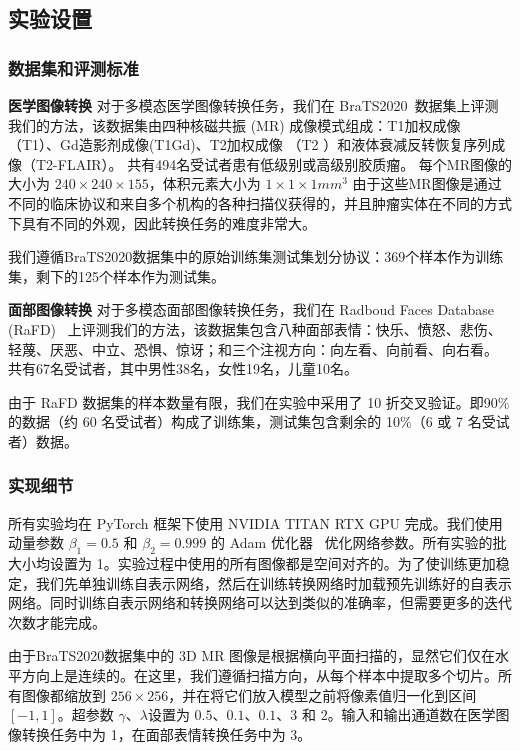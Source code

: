 \subsection{实验设置}

\subsubsection{数据集和评测标准}

\textbf{医学图像转换}
对于多模态医学图像转换任务，我们在 BraTS2020~\cite{bakas2018identifying}数据集上评测我们的方法，该数据集由四种核磁共振 (MR) 成像模式组成：T1加权成像（T1）、Gd造影剂成像(T1Gd)、T2加权成像 （T2 ）和液体衰减反转恢复序列成像（T2-FLAIR）。 共有494名受试者患有低级别或高级别胶质瘤。 每个MR图像的大小为 $240\times240\times155$，体积元素大小为 $1\times 1\times 1 mm^3$ 由于这些MR图像是通过不同的临床协议和来自多个机构的各种扫描仪获得的，并且肿瘤实体在不同的方式下具有不同的外观，因此转换任务的难度非常大。

我们遵循BraTS2020数据集中的原始训练集测试集划分协议：369个样本作为训练集，剩下的125个样本作为测试集。

\textbf{面部图像转换}
对于多模态面部图像转换任务，我们在 Radboud Faces Database (RaFD)~\cite{langner2010presentation} 上评测我们的方法，该数据集包含八种面部表情：快乐、愤怒、悲伤、轻蔑、厌恶、中立、恐惧、惊讶；和三个注视方向：向左看、向前看、向右看。 共有67名受试者，其中男性38名，女性19名，儿童10名。

由于 RaFD 数据集的样本数量有限，我们在实验中采用了 10 折交叉验证。即90\%的数据（约 60 名受试者）构成了训练集，测试集包含剩余的 10\%（6 或 7 名受试者）数据。

\subsubsection{实现细节}
所有实验均在 PyTorch 框架下使用 NVIDIA TITAN RTX GPU 完成。我们使用动量参数 $\beta_1 = 0.5$ 和 $\beta_2 = 0.999$ 的 Adam 优化器~\cite{kingma2014adam} 优化网络参数。所有实验的批大小均设置为 1。实验过程中使用的所有图像都是空间对齐的。为了使训练更加稳定，我们先单独训练自表示网络，然后在训练转换网络时加载预先训练好的自表示网络。同时训练自表示网络和转换网络可以达到类似的准确率，但需要更多的迭代次数才能完成。

由于BraTS2020数据集中的 3D MR 图像是根据横向平面扫描的，显然它们仅在水平方向上是连续的。在这里，我们遵循扫描方向，从每个样本中提取多个切片。所有图像都缩放到 $256\times256$，并在将它们放入模型之前将像素值归一化到区间 $[-1, 1]$。超参数 $\gamma$、$\lambda$设置为 $0.5$、$0.1$、$0.1$、$3$ 和 $2$。输入和输出通道数在医学图像转换任务中为 1，在面部表情转换任务中为 3。

